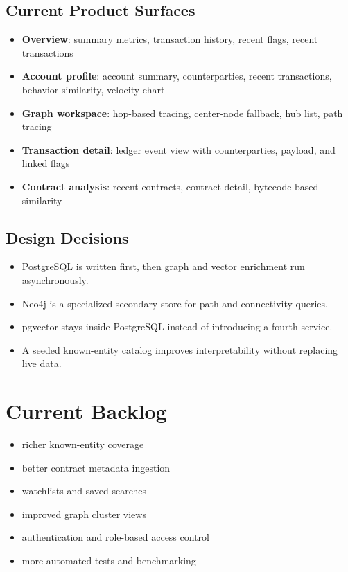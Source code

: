 \documentclass[11pt,a4paper]{article}
\begin{document}
\subsection{Current Product Surfaces}

\begin{itemize}
\item \textbf{Overview}: summary metrics, transaction history, recent flags, recent transactions
\item \textbf{Account profile}: account summary, counterparties, recent transactions, behavior similarity, velocity chart
\item \textbf{Graph workspace}: hop-based tracing, center-node fallback, hub list, path tracing
\item \textbf{Transaction detail}: ledger event view with counterparties, payload, and linked flags
\item \textbf{Contract analysis}: recent contracts, contract detail, bytecode-based similarity
\end{itemize}

\subsection{Design Decisions}

\begin{itemize}
\item PostgreSQL is written first, then graph and vector enrichment run asynchronously.
\item Neo4j is a specialized secondary store for path and connectivity queries.
\item pgvector stays inside PostgreSQL instead of introducing a fourth service.
\item A seeded known-entity catalog improves interpretability without replacing live data.
\end{itemize}

\section{Current Backlog}

\begin{itemize}
\item richer known-entity coverage
\item better contract metadata ingestion
\item watchlists and saved searches
\item improved graph cluster views
\item authentication and role-based access control
\item more automated tests and benchmarking
\end{itemize}
\end{document}
